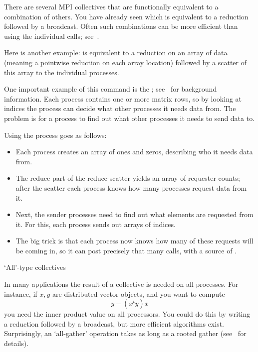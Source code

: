 There are several MPI collectives that are functionally equivalent to
a combination of others. You have already seen  which
is equivalent to a reduction followed by a broadcast. Often such
combinations can be more efficient than using the individual calls;
see~.

Here is another example:  is equivalent
to a reduction on an array of data (meaning a pointwise reduction on each
array location) followed by a scatter of this array to the individual 
processes.

One important example of this command is the
;
see~ for background information.
Each process contains one or more matrix rows, so by looking at indices
the process can decide what other processes it needs data from.
The problem is for a process to find out what other processes 
it needs to send data to. 

Using  the process goes as follows:
\begin{itemize}
\item Each process creates an array of ones and zeros, describing who
  it needs data from.
\item The reduce part of the reduce-scatter yields an array of
  requester counts; after the scatter each process knows how many
  processes request data from it.
\item Next, the sender processes need to find out what elements are
  requested from it. For this, each process sends out arrays of
  indices.
\item The big trick is that each process now knows how many of these
  requests will be coming in, so it can post precisely that many
   calls, with a source of .
\end{itemize}

 {`All'-type collectives}

In many applications the result of a collective is needed on all processes.
For instance, if $x,y$ are distributed vector objects, and you want to compute
\[ y- (x^ty)x \]
you need the inner product value on all processors. You could do this
by writing a reduction followed by a broadcast, but more efficient
algorithms exist.  Surprisingly, an `all-gather' operation takes as
long as a rooted gather (see~ for details).

